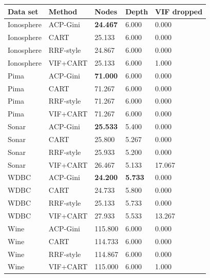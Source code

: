 \begin{tabular}{lllll}
\toprule
Data set & Method & Nodes & Depth & VIF dropped \\
\midrule
Ionosphere & ACP-Gini & \textbf{24.467} & 6.000 & 0.000 \\
Ionosphere & CART & 25.133 & 6.000 & 0.000 \\
Ionosphere & RRF-style & 24.867 & 6.000 & 0.000 \\
Ionosphere & VIF+CART & 25.133 & 6.000 & 1.000 \\
Pima & ACP-Gini & \textbf{71.000} & 6.000 & 0.000 \\
Pima & CART & 71.267 & 6.000 & 0.000 \\
Pima & RRF-style & 71.267 & 6.000 & 0.000 \\
Pima & VIF+CART & 71.267 & 6.000 & 0.000 \\
Sonar & ACP-Gini & \textbf{25.533} & 5.400 & 0.000 \\
Sonar & CART & 25.800 & 5.267 & 0.000 \\
Sonar & RRF-style & 25.933 & 5.200 & 0.000 \\
Sonar & VIF+CART & 26.467 & 5.133 & 17.067 \\
WDBC & ACP-Gini & \textbf{24.200} & \textbf{5.733} & 0.000 \\
WDBC & CART & 24.733 & 5.800 & 0.000 \\
WDBC & RRF-style & 25.133 & 5.733 & 0.000 \\
WDBC & VIF+CART & 27.933 & 5.533 & 13.267 \\
Wine & ACP-Gini & 115.800 & 6.000 & 0.000 \\
Wine & CART & 114.733 & 6.000 & 0.000 \\
Wine & RRF-style & 114.867 & 6.000 & 0.000 \\
Wine & VIF+CART & 115.000 & 6.000 & 1.000 \\
\bottomrule
\end{tabular}
